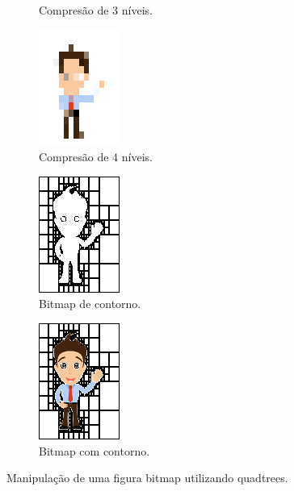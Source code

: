 \documentclass[a4paper]{article}
\begin{document}
\begin{figure}
\begin{subfigure}{0.5\textwidth}
\caption{Compresão de $3$ níveis.}
\label{fig:person3}
\end{subfigure}
%
\begin{subfigure}{0.5\textwidth}
\centering
\includegraphics[width=0.2\linewidth]{cp1718t_media/person4.png}
\caption{Compresão de $4$ níveis.}
\label{fig:person4}
\end{subfigure}
%
\begin{subfigure}{0.5\textwidth}
\centering
\includegraphics[width=0.2\linewidth]{cp1718t_media/personOut1.png}
\caption{Bitmap de contorno.}
\label{fig:personOut1}
\end{subfigure}
%
\begin{subfigure}{0.5\textwidth}
\centering
\includegraphics[width=0.2\linewidth]{cp1718t_media/personOut2.png}
\caption{Bitmap com contorno.}
\label{fig:personOut2}
\end{subfigure}
%
\caption{Manipulação de uma figura bitmap utilizando quadtrees.}
\end{figure}
\end{document}
